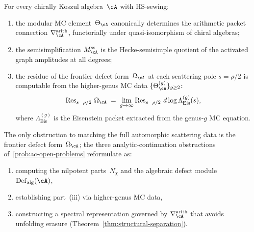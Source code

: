 \begin{conjecture}%
\label{conj:arithmetic-comparison}%
\ClaimStatusConjectured%
%
For every chirally Koszul algebra~$\cA$ with HS-sewing\textup{:}
\begin{enumerate}[label=\textup{(\roman*)}]
\item the modular MC element~$\Theta_\cA$ canonically
 determines the arithmetic packet connection
 $\nabla_\cA^{\mathrm{arith}}$, functorially under
 quasi-isomorphism of chiral algebras\textup{;}
\item the semisimplification $M_\cA^{\mathrm{ss}}$ is the
 Hecke-semisimple quotient of the activated graph amplitudes
 at all degrees\textup{;}
\item the residue of the frontier defect form~$\Omega_\cA$ at
 each scattering pole $s = \rho/2$ is computable from
 the higher-genus MC data
 $\{\Theta_\cA^{(g)}\}_{g \ge 2}$\textup{:}
 \begin{equation}\label{eq:higher-genus-scattering-access}
 \operatorname{Res}_{s = \rho/2}\,\Omega_\cA
 \;=\;
 \lim_{g\to\infty}
 \operatorname{Res}_{s=\rho/2}\,
 d\log\Lambda_{\mathrm{Eis}}^{(g)}(s),
 \end{equation}
 where $\Lambda_{\mathrm{Eis}}^{(g)}$ is the Eisenstein
 packet extracted from the genus-$g$ MC equation.
\end{enumerate}
The only obstruction to matching the full automorphic
scattering data is the frontier defect form~$\Omega_\cA$;
the three analytic-continuation obstructions of~\textup{\ref{prob:ac-open-problems}}
reformulate as:
\begin{enumerate}[label=\textup{(\Alph*$'$)},nosep]
\item computing the nilpotent parts~$N_\chi$ and the algebraic
 defect module $\operatorname{Def}_{\mathrm{alg}}(\cA)$,
\item establishing part~\textup{(iii)} via higher-genus MC data,
\item constructing a spectral representation governed by
 $\nabla_\cA^{\mathrm{arith}}$ that avoids unfolding erasure
 \textup{(}Theorem~\textup{\ref{thm:structural-separation}}\textup{)}.
\end{enumerate}
\end{conjecture}

